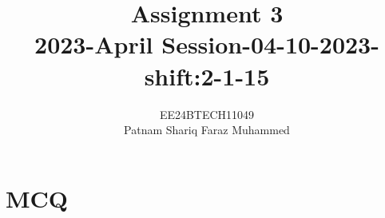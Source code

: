 \documentclass[journal]{IEEEtran}
\numberwithin{equation}{enumi}
\numberwithin{figure}{enumi}
\begin{document}


\title{Assignment 3 \\ 2023-April Session-04-10-2023-shift:2-1-15}
\author{EE24BTECH11049 \\ Patnam Shariq Faraz Muhammed}

{\let\newpage\relax\maketitle}

\section*{MCQ}
\end{document}
